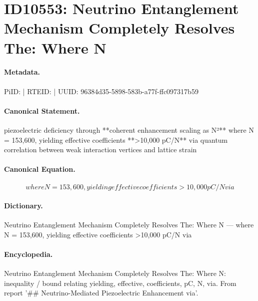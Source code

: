 \section*{ID10553: Neutrino Entanglement Mechanism Completely Resolves The: Where N}
\paragraph{Metadata.}
PiID:  | RTEID:  | UUID: 96384d35-5898-583b-a77f-ffc097317b59

\paragraph{Canonical Statement.}
piezoelectric deficiency through **coherent enhancement scaling as N²** where N = 153,600, yielding effective coefficients **>10,000 pC/N** via quantum correlation between weak interaction vertices and lattice strain

\paragraph{Canonical Equation.}
\[
where N = 153,600, yielding effective coefficients >10,000 pC/N via
\]

\paragraph{Dictionary.}
Neutrino Entanglement Mechanism Completely Resolves The: Where N — where N = 153,600, yielding effective coefficients >10,000 pC/N via

\paragraph{Encyclopedia.}
Neutrino Entanglement Mechanism Completely Resolves The: Where N: inequality / bound relating yielding, effective, coefficients, pC, N, via. From report '\#\# Neutrino-Mediated Piezoelectric Enhancement via'.
